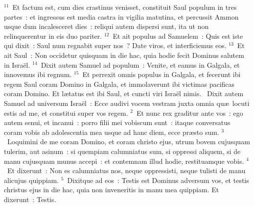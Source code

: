 ${}^{11}$~Et factum est, cum dies crastinus venisset, constituit Saul populum in tres partes~: et ingressus est media castra in vigilia matutina, et percussit Ammon usque dum incalesceret dies~: reliqui autem dispersi sunt, ita ut non relinquerentur in eis duo pariter.
${}^{12}$~Et ait populus ad Samuelem~: Quis est iste qui dixit~: Saul num regnabit super nos~? Date viros, et interficiemus eos.
${}^{13}$~Et ait Saul~: Non occidetur quisquam in die hac, quia hodie fecit Dominus salutem in Isra\"el.
${}^{14}$~Dixit autem Samuel ad populum~: Venite, et eamus in Galgala, et innovemus ibi regnum.
${}^{15}$~Et perrexit omnis populus in Galgala, et fecerunt ibi regem Saul coram Domino in Galgala, et immolaverunt ibi victimas pacificas coram Domino. Et l\ae tatus est ibi Saul, et cuncti viri Isra\"el nimis.
~\lettrine[lines=10,image=true,loversize=0.05,lraise=-0.03]{D}{}ixit autem Samuel ad universum Isra\"el~: Ecce audivi vocem vestram juxta omnia qu\ae\ locuti estis ad me, et constitui super vos regem.
${}^{2}$~Et nunc rex graditur ante vos~: ego autem senui, et incanui~: porro filii mei vobiscum sunt~: itaque conversatus coram vobis ab adolescentia mea usque ad hanc diem, ecce pr\ae sto sum.
${}^{3}$~Loquimini de me coram Domino, et coram christo ejus, utrum bovem cujusquam tulerim, aut asinum~: si quempiam calumniatus sum, si oppressi aliquem, si de manu cujusquam munus accepi~: et contemnam illud hodie, restituamque vobis.
${}^{4}$~Et dixerunt~: Non es calumniatus nos, neque oppressisti, neque tulisti de manu alicujus quippiam.
${}^{5}$~Dixitque ad eos~: Testis est Dominus adversum vos, et testis christus ejus in die hac, quia non inveneritis in manu mea quippiam. Et dixerunt~: Testis.


